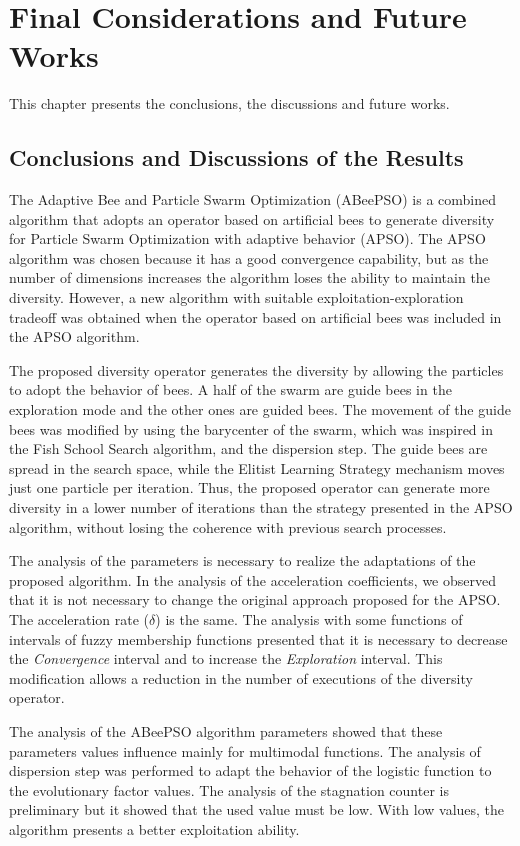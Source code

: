 \chapter{Final Considerations and Future Works}
This chapter presents the conclusions, the discussions and future works.

\section{Conclusions and Discussions of the Results}
The Adaptive Bee and Particle Swarm Optimization (ABeePSO) is a combined algorithm that adopts an operator based on artificial bees to generate diversity for Particle Swarm Optimization with adaptive behavior (APSO). The APSO algorithm was chosen because it has a good convergence capability, but as the number of dimensions increases the algorithm loses the ability to maintain the diversity. However, a new algorithm with suitable exploitation-exploration tradeoff was obtained when the operator based on artificial bees was included in the APSO algorithm.

The proposed diversity operator generates the diversity by allowing the particles to adopt the behavior of bees. A half of the swarm are guide bees in the exploration mode and the other ones are guided bees. The movement of the guide bees was modified by using the barycenter of the swarm, which was inspired in the Fish School Search algorithm, and the dispersion step. The guide bees are spread in the search space, while the Elitist Learning Strategy mechanism moves just one particle per iteration. Thus, the proposed operator can generate more diversity in a lower number of iterations than the strategy presented in the APSO algorithm, without losing the coherence with previous search processes.

The analysis of the parameters is necessary to realize the adaptations of the proposed algorithm. In the analysis of the acceleration coefficients, we observed that it is not necessary to change the original approach proposed for the APSO. The acceleration rate ($\delta$) is the same. The analysis with some functions of intervals of fuzzy membership functions presented that it is necessary to decrease the \emph{Convergence} interval and to increase the \emph{Exploration} interval. This modification allows a reduction in the number of executions of the diversity operator.

The analysis of the ABeePSO algorithm parameters showed that these parameters values influence mainly for multimodal functions. The analysis of dispersion step was performed to adapt the behavior of the logistic function to the evolutionary factor values. The analysis of the stagnation counter is preliminary but it showed that the used value must be low. With low values, the algorithm presents a better exploitation ability.

